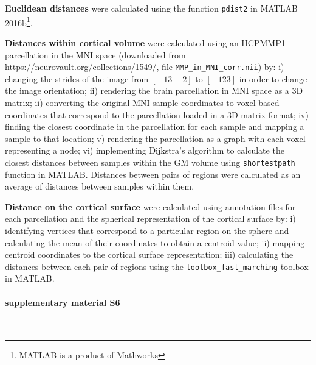 \documentclass[10pt,A4]{article}
\begin{document}
\textbf{Euclidean distances} were calculated using the function \texttt{pdist2} in MATLAB 2016b\footnote{MATLAB is a product of Mathworks}.

\textbf{Distances within cortical volume} were calculated using an HCPMMP1 \citep{Glasser2016} parcellation in the MNI space (downloaded from \url{https://neurovault.org/collections/1549/}, file \texttt{MMP\_in\_MNI\_corr.nii})  by: i) changing the strides of the image from $[-1 3 -2]$ to $[-1 2 3]$ in order to change the image orientation; ii) rendering the brain parcellation in MNI space as a 3D matrix; ii) converting the original MNI sample coordinates to voxel-based coordinates that correspond to the parcellation loaded in a 3D matrix format; iv) finding the closest coordinate in the parcellation for each sample and mapping a sample to that location; v) rendering the parcellation as a graph with each voxel representing a node; vi) implementing Dijkstra’s algorithm \citep{Dijkstra1959} to calculate the closest distances between samples within the GM volume using \texttt{shortestpath} function in MATLAB. Distances between pairs of regions were calculated as an average of distances between samples within them.

\textbf{Distance on the cortical surface} were calculated using annotation files for each parcellation and the spherical representation of the cortical surface by: i) identifying vertices that correspond to a particular region on the sphere and calculating the mean of their coordinates to obtain a centroid value; ii) mapping centroid coordinates to the cortical surface representation; iii) calculating the distances between each pair of regions using the \texttt{toolbox\_fast\_marching} toolbox in MATLAB.

\paragraph*{supplementary material S6}\mbox{}\\
\label{SItext6}
\end{document}
